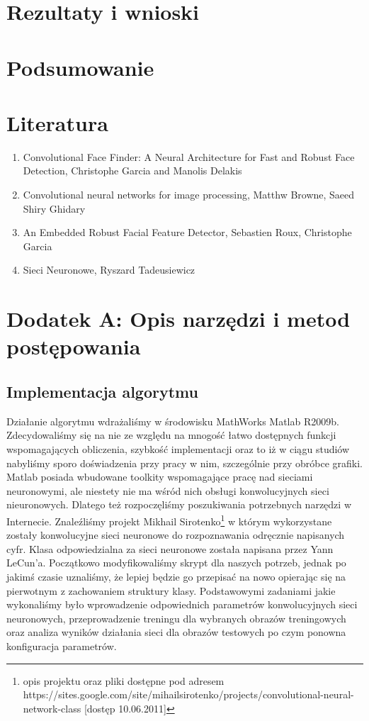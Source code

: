 \documentclass[11pt,a4paper]{article}
\begin{document}
\section{Rezultaty i wnioski}

\section{Podsumowanie}

\section{Literatura}
 \begin{enumerate}
\item Convolutional Face Finder: A Neural Architecture for Fast and Robust Face Detection, Christophe Garcia and Manolis Delakis
\item Convolutional neural networks for image processing, Matthw Browne, Saeed Shiry Ghidary
\item An Embedded Robust Facial Feature Detector, Sebastien Roux, Christophe Garcia
\item Sieci Neuronowe, Ryszard Tadeusiewicz
 \end{enumerate}
\section{Dodatek A: Opis narzędzi i metod postępowania}
\subsection{Implementacja algorytmu}
Działanie algorytmu wdrażaliśmy w środowisku MathWorks Matlab R2009b. Zdecydowaliśmy się na nie ze względu na mnogość łatwo dostępnych funkcji wspomagających obliczenia, szybkość implementacji oraz to iż w ciągu studiów nabyliśmy sporo doświadzenia przy pracy w nim, szczególnie przy obróbce grafiki.
\indent
Matlab posiada wbudowane toolkity wspomagające pracę nad sieciami neuronowymi, ale niestety nie ma wśród nich obsługi konwolucyjnych sieci nieuronowych. Dlatego też rozpoczęliśmy poszukiwania potrzebnych narzędzi w Internecie. Znaleźliśmy projekt Mikhail Sirotenko\footnote{ opis projektu oraz pliki dostępne pod adresem  https://sites.google.com/site/mihailsirotenko/projects/convolutional-neural-network-class [dostęp 10.06.2011]}  w którym wykorzystane zostały konwolucyjne sieci neuronowe do rozpoznawania odręcznie napisanych cyfr. Klasa odpowiedzialna za sieci neuronowe została napisana przez Yann LeCun'a. Początkowo modyfikowaliśmy skrypt dla naszych potrzeb, jednak po jakimś czasie uznaliśmy, że lepiej będzie go przepisać na nowo opierając się na pierwotnym z zachowaniem struktury klasy. Podstawowymi zadaniami jakie wykonaliśmy było wprowadzenie odpowiednich parametrów konwolucyjnych sieci neuronowych, przeprowadzenie treningu dla wybranych obrazów treningowych oraz analiza wyników działania sieci dla obrazów testowych po czym ponowna konfiguracja parametrów.
\indent
\end{document}
